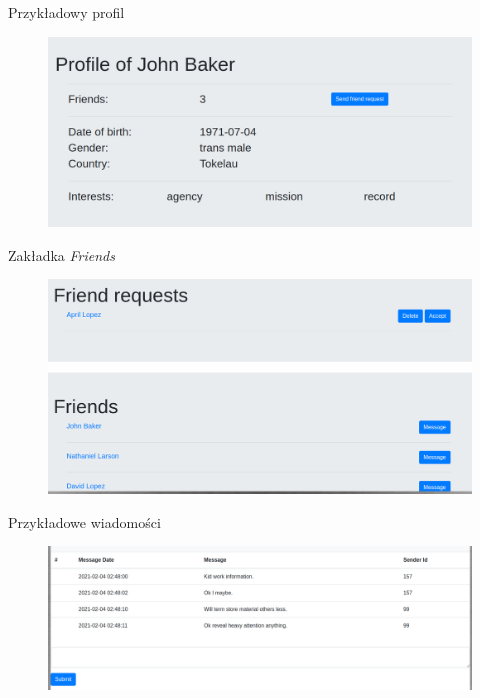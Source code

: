 \documentclass[handout]{beamer}
\begin{document}
        \begin{frame}{Przykładowy profil}
            \begin{figure}
                \centering
                \includegraphics[width=\linewidth]{example_profile.png}
            \end{figure}
        \end{frame}
        
        \begin{frame}{Zakładka \textit{Friends}}
            \begin{figure}
                \centering
                \includegraphics[width=\linewidth]{friends.png}
            \end{figure}
        \end{frame}
        
        \begin{frame}{Przykładowe wiadomości}
            \begin{figure}
                \centering
                \includegraphics[width=\linewidth]{messages.png}
            \end{figure}
        \end{frame}
        
\end{document}
